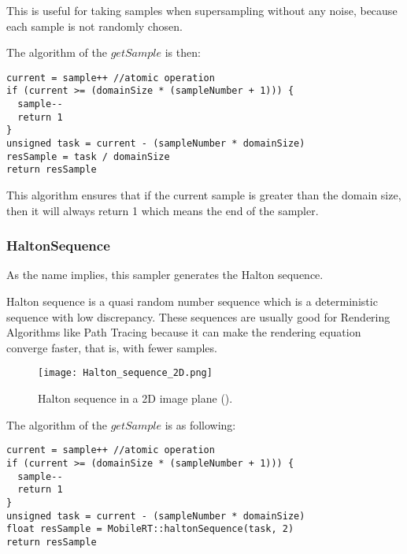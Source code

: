 \par
This is useful for taking samples when supersampling without any noise, because each sample is not randomly chosen.

\par
The algorithm of the
$getSample$
is then:

\begin{lstlisting}[caption={Algorithm of Stratified Sampler}, captionpos=b, label=Stratified]
current = sample++ //atomic operation
if (current >= (domainSize * (sampleNumber + 1))) {
  sample--
  return 1
}
unsigned task = current - (sampleNumber * domainSize)
resSample = task / domainSize
return resSample
\end{lstlisting}

This algorithm ensures that if the current sample is greater than the domain size, then it will always return 1 which means the end of the sampler.


\subsubsection{HaltonSequence}

\par
As the name implies, this sampler generates the Halton sequence.

\par
Halton sequence is a quasi random number sequence which is a deterministic sequence with low discrepancy.
These sequences are usually good for Rendering Algorithms like Path Tracing because it can make the rendering equation converge faster, that is, with fewer samples.

\begin{figure}[H]
	\centering
	\caption{Halton sequence in a 2D image plane (\cite{HaltonSequence}).}
	\label{Halton_sequence_2D.}
	\texttt{[image: Halton\_sequence\_2D.png]}
\end{figure}

\par
The algorithm of the
$getSample$
is as following:

\begin{lstlisting}[caption={Algorithm of HaltonSequence Sampler}, captionpos=b, label=HaltonSequenceSampler]
current = sample++ //atomic operation
if (current >= (domainSize * (sampleNumber + 1))) {
  sample--
  return 1
}
unsigned task = current - (sampleNumber * domainSize)
float resSample = MobileRT::haltonSequence(task, 2)
return resSample
\end{lstlisting}

